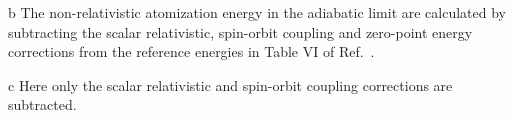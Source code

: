 \begin{table*}[t!]
\begin{threeparttable}
\begin{tablenotes}
\item[b] The non-relativistic atomization energy in the adiabatic limit are calculated by subtracting the scalar relativistic, spin-orbit coupling and zero-point energy corrections from the reference energies in Table VI of Ref.~\cite{Feller_Corrections}.
\item[c] Here only the scalar relativistic and spin-orbit coupling corrections are subtracted.
\end{tablenotes}
\end{threeparttable}
\end{table*}